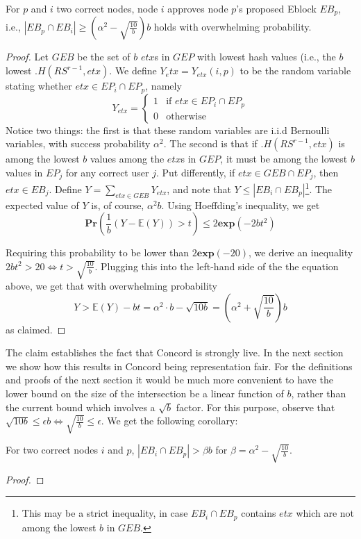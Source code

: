 \begin{claim} {}For $p$ and $i$ two correct nodes, node $i$ approves node $p$'s proposed Eblock $EB_p$, i.e., $|EB_p\cap EB_i|\geq \left(\alpha^2 -\sqrt{\frac{10}{b}}\right)b$ holds with overwhelming probability.
\end{claim}

\begin{proof}
Let $GEB$ be the set of $b$ $etx$s in $GEP$ with lowest hash values (i.e., the $b$ lowest $.H(RS^{r-1},etx)$. We define $Y_etx=Y_{etx}(i,p)$ to be the random variable stating whether $etx\in EP_i\cap EP_p$, namely 
\begin{equation}
    		Y_{etx} =	
		    \begin{cases}
    			  1  &\mbox{if }  etx\in EP_i\cap EP_p \\
     			  0  &\mbox{otherwise}
		     \end{cases}
  	\end{equation}
Notice two things: the first is that these random variables are i.i.d Bernoulli variables, with success probability $\alpha^2$. The second is that if $.H(RS^{r-1},etx)$ is among the lowest $b$ values among the $etx$s in $GEP$, it must be among the lowest $b$ values in $EP_j$ for any correct user $j$. Put differently, if $etx\in GEB\cap EP_j$, then $etx\in EB_j$. Define $Y=\sum_{etx\in GEB} Y_{etx}$, and note that $Y\leq |EB_i\cap EB_p|$\footnote{This may be a strict inequality, in case $EB_i\cap EB_p$ contains $etx$ which are not among the lowest $b$ in $GEB$.}. The expected value of $Y$ is, of course, $\alpha^2 b$. Using Hoeffding's inequality, we get
$$\textbf{Pr}(\frac{1}{b}(Y-\mathbb{E}(Y))>t)\leq 2\textbf{exp}(-2bt^2)$$

Requiring this probability to be lower than $2\textbf{exp}(-20)$, we derive an inequality $2bt^2>20\iff t>\sqrt{\frac{10}{b}}$.
Plugging this into the left-hand side of the the equation above, we get that with overwhelming probability  
$$Y>\mathbb{E}(Y)-bt=\alpha^2\cdot b -\sqrt{10b}=(\alpha^2+\sqrt{\frac{10}{b}})b$$
as claimed.
\end{proof}

The claim establishes the fact that Concord is strongly live. In the next section we show how this results in Concord being representation fair. For the definitions and proofs of the next section it would be much more convenient to have the lower bound on the size of the intersection be a linear function of $b$, rather than the current bound which involves a $\sqrt{b}$ factor. For this purpose, observe that $\sqrt{10b}\leq\epsilon b\iff \sqrt{\frac{10}{b}}\leq \epsilon$. We get the following corollary:
\begin{corollary}
	For two correct nodes $i$ and $p$, $|EB_i\cap EB_p|>\beta b$ for $\beta=\alpha^2-\sqrt{\frac{10}{b}}$.
\end{corollary} 
\begin{proof}
\end{proof}


